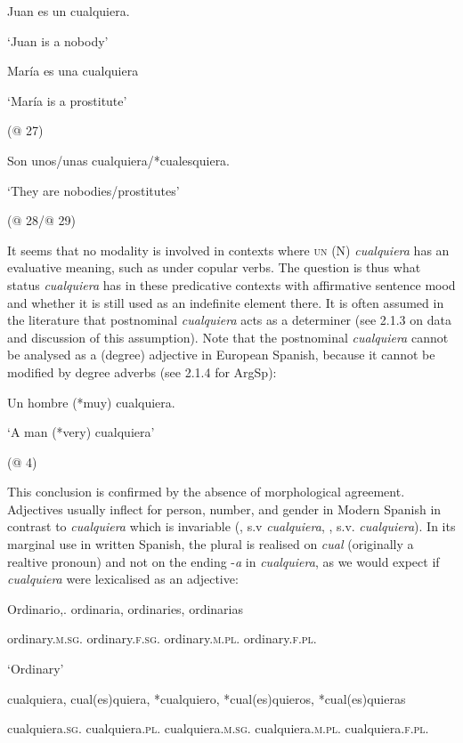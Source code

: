 \label{bkm:Ref150778470}  Juan es un cualquiera.

  ‘Juan is a nobody’ 

  \citep[36]{Martínez2005}

\label{bkm:Ref150778472}  María es una cualquiera

  ‘María is a prostitute’

  (@ 27)

\label{bkm:Ref533761216}  Son unos/unas cualquiera/*cualesquiera.

  ‘They are nobodies/prostitutes’

  (@ 28/@ 29)

It seems that no modality is involved in contexts where \textsc{un} (N) \textit{cualquiera} has an evaluative meaning, such as under copular verbs. The question is thus what status \textit{cualquiera} has in these predicative contexts with affirmative sentence mood and whether it is still used as an indefinite element there. It is often assumed in the literature that postnominal \textit{cualquiera} acts as a determiner (see 2.1.3 on data and discussion of this assumption). Note that the postnominal \textit{cualquiera} cannot be analysed as a (degree) adjective in European Spanish, because it cannot be modified by degree adverbs (see 2.1.4 for ArgSp):

  Un hombre (*muy) cualquiera.

  ‘A man (*very) cualquiera’

  (@ 4)

This conclusion is confirmed by the absence of morphological agreement. Adjectives usually inflect for person, number, and gender in Modern Spanish in contrast to \textit{cualquiera} which is invariable (\citealt{Seco1986}, s.v \textit{cualquiera}, \citealt{Rainer1993}, s.v. \textit{cualquiera}). In its marginal use in written Spanish, the plural is realised on \textit{cual} (originally a realtive pronoun) and not on the ending -\textit{a} in \textit{cualquiera}, as we would expect if \textit{cualquiera} were lexicalised as an adjective:

  Ordinario,.  ordinaria,  ordinaries,  ordinarias

  ordinary.\textsc{m.sg.}  ordinary.\textsc{f.sg}.  ordinary.\textsc{m.pl}.  ordinary.\textsc{f.pl.}

  ‘Ordinary’

  cualquiera,   cual(es)quiera,  *cualquiero,  *cual(es)quieros,  *cual(es)quieras

  cualquiera.\textsc{sg}.  cualquiera.\textsc{pl}.  cualquiera.\textsc{m.sg}.  cualquiera.\textsc{m.pl.}  cualquiera.\textsc{f.pl.}

